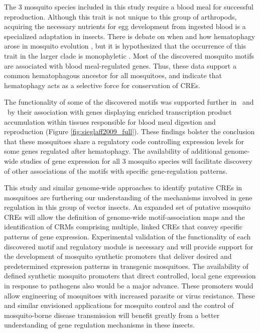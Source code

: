 The 3 mosquito species included in this study require a blood meal for successful reproduction. Although this trait is not unique to this group of arthropods, acquiring the necessary nutrients for egg development from ingested blood is a specialized adaptation in insects. There is debate on when and how \gls{hematophagy} arose in mosquito evolution \cite{Rai1999a}, but it is hypothesized that the occurrence of this trait in the larger clade is \gls{monophyletic} \cite{Borkent2004,Calvo2006}. Most of the discovered mosquito motifs are associated with blood meal-regulated genes. Thus, these data support a common hematophagous ancestor for all mosquitoes, and indicate that \gls{hematophagy} acts as a selective force for conservation of \glspl{CRE}.

The functionality of some of the discovered motifs was supported further in \Ag\ and \Aa\ by their association with genes displaying enriched transcription product accumulation within tissues responsible for blood meal digestion and reproduction (Figure \ref{fig:sieglaff2009_full}). These findings bolster the conclusion that these mosquitoes share a regulatory code controlling expression levels for some genes regulated after \gls{hematophagy}. The availability of additional genome-wide studies of gene expression for all 3 mosquito species will facilitate discovery of other associations of the motifs with specific gene-regulation patterns.

This study and similar genome-wide approaches to identify putative \glspl{CRE} in mosquitoes \cite{Hernandez-Romano2008} are furthering our understanding of the mechanisms involved in gene regulation in this group of vector insects. An expanded set of putative mosquito \glspl{CRE} will allow the definition of genome-wide motif-association maps and the identification of \glspl{CRM} comprising multiple, linked \glspl{CRE} that convey specific patterns of gene expression. Experimental validation of the functionality of each discovered motif and regulatory module is necessary and will provide support for the development of mosquito synthetic promoters that deliver desired and predetermined expression patterns in transgenic mosquitoes. 
The availability of defined synthetic mosquito promoters that direct controlled, local gene expression in response to pathogens also would be a major advance. These promoters would allow engineering of mosquitoes with increased parasite or virus resistance. These and similar envisioned applications for mosquito control and the control of mosquito-borne disease transmission will benefit greatly from a better understanding of gene regulation mechanisms in these insects.











